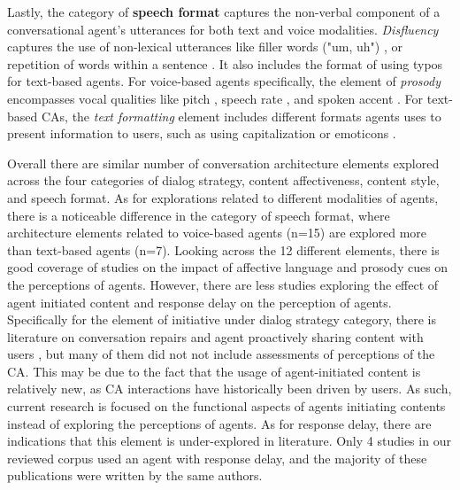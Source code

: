 Lastly, the category of \textbf{speech format} captures the non-verbal component of a conversational agent's utterances for both text and voice modalities. \textit{Disfluency} captures 
the use of non-lexical utterances like filler words ("um, uh") \cite{hu2021enhancing}\cmt{[56]}\cite{jeong2019exploring}\cmt{[10]}, or repetition of words within a sentence \cite{yang2021effect}\cmt{[72]}. It also includes the format of using typos \cite{westerman2019believe}\cmt{[9]} for text-based agents. For voice-based agents specifically, the element of \textit{prosody} encompasses vocal qualities like pitch \cite{habler2019effects}\cmt{[63]}\cite{jestin2022effects}\cmt{[81]}, speech rate \cite{choi2020nobody}\cmt{[54]}, and spoken accent \cite{feijoo2021effects}\cmt{[70]}. For text-based CAs, the \textit{text formatting} element includes different formats agents uses to present information to users, such as using capitalization \cite{westerman2019believe}\cmt{[9]} or emoticons \cite{kim2019comparing}\cmt{[89]}\cite{wilhelm2022keep}\cmt{[28]}. 

Overall there are similar number of conversation architecture elements explored across the four categories of dialog strategy, content affectiveness, content style, and speech format. As for explorations related to different modalities of agents, there is a noticeable difference in the category of speech format, where architecture elements related to voice-based agents (n=15) are explored more than text-based agents (n=7). Looking across the 12 different elements, there is good coverage of studies on the impact of affective language and prosody cues on the perceptions of agents. However, there are less studies exploring the effect of agent initiated content and response delay on the perception of agents. Specifically for the element of initiative under dialog strategy category, there is literature on conversation repairs \cite{komatani2010online}\cite{reinkemeier2022repair} and agent proactively sharing content with users \cite{dubiel2019inquisitive}\cite{zargham2022understanding}, but many of them did not not include assessments of perceptions of the CA. This may be due to the fact that the usage of agent-initiated content is relatively new, as CA interactions have historically been driven by users. As such, current research is focused on the functional aspects of agents initiating contents instead of exploring the perceptions of agents. As for response delay, there are indications that this element is under-explored in literature. Only 4 studies in our reviewed corpus used an agent with response delay, and the majority of these publications were written by the same authors.



